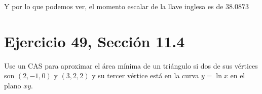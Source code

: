 \documentclass[11pt,letterpaper]{article}
\begin{document}
Y por lo que podemos ver, el momento escalar de la llave inglesa es de $38.0873$ 

\section{Ejercicio 49, Sección 11.4}
Use un CAS para aproximar el área mínima de un triángulo si dos de sus vértices son $(2, -1, 0)$ y $(3, 2, 2)$ y su tercer vértice está en la curva $y = \ln x$ en el plano $xy$.
\end{document}
